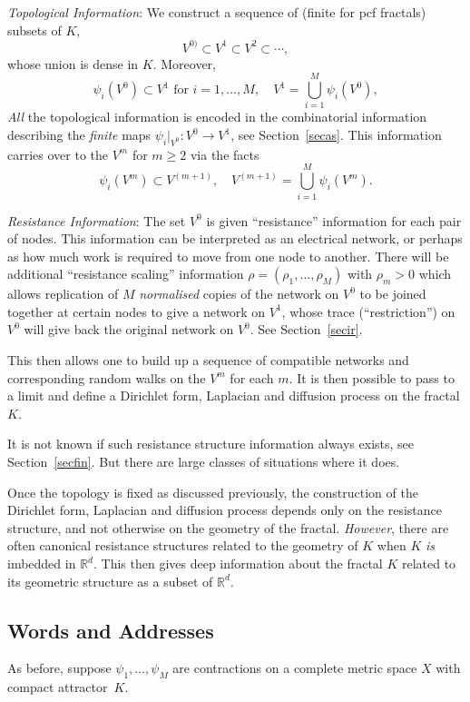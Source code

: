 \documentclass[a4paper]{amsart}
\theoremstyle{plain}
\theoremstyle{definition}
\theoremstyle{remark}
\begin{document}
\medskip
\emph{Topological Information}:   We construct a sequence of (finite for pcf fractals) subsets of $ K $, 
\[ V^{0)} \subset V^{1} \subset V^{2} \subset \cdots ,\]
 whose union is dense in $ K $. Moreover, 
 \[    \psi_i ( V^{0}) \subset V^{1}  \text{ for } i=1,\dots, M, \quad V^{1} =\bigcup_{i=1}^M \psi_i(V^{0}), \]
\emph{All} the topological information is encoded in the combinatorial information describing the  \emph{finite} maps
$\psi_i|_{V^{0}}: V^{0} \to V^{1} $, see Section~\ref{secas}.   This information carries over  to the  $ V^{m} $ for 
$ m\geq 2 $ via the facts
 \[    \psi_i ( V^{m} )\subset V^{(m+1 )}   , \quad V^{(m+1)} =\bigcup_{i=1}^M \psi_i(V^{m}). \]


\medskip
\emph{Resistance Information}: The set  $ V^{0} $ is given ``resistance'' information for each pair of nodes. This information can be interpreted as an electrical network, or perhaps as how much work is required to move from one node to another.  There will be additional ``resistance scaling'' information $ \rho = (\rho_1,\dots, \rho_M) $ with $ \rho_m>0 $ which allows replication of $ M $ \emph{normalised} copies of the network on $ V^{0} $  to be joined together at certain nodes to give a network on $ V^{1} $, whose trace (``restriction'') on $ V^{0} $ will give back the original network on $ V^{0} $.  See Section~\ref{secir}.

This then allows one to build up a sequence of compatible networks and corresponding random walks on the $ V^{m} $ for each $ m $.  It is then  possible to pass to a limit and define a Dirichlet form, Laplacian and diffusion process on the fractal $ K $.


It is not known if such  resistance structure information always exists, see Section~\ref{secfin}. But there are large classes of situations where it does.
 
\medskip Once the topology is fixed as discussed previously, the construction of the Dirichlet form, Laplacian and diffusion process depends only on the resistance structure, and not otherwise on the geometry of the fractal.  \emph{However}, there are often canonical resistance structures related to the geometry of $ K $ when $ K $ \emph{is} imbedded in $ \mathbb{R}^d$.  This then gives  deep information about the fractal $ K $   related to its geometric structure as a subset of $\mathbb{R}^d  $.

\subsection{Words and Addresses} As before, suppose $ \psi_1,\dots,\psi_M $ are contractions on a complete metric space $ X $ with compact attractor~$ K $.  
\end{document}
